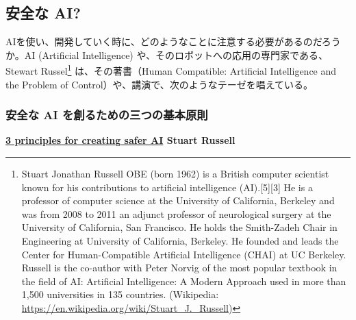 \documentclass[
]{bxjsbook}
\theoremstyle{definition}
\theoremstyle{definition}
\theoremstyle{definition}
\theoremstyle{definition}
\theoremstyle{remark}
\begin{document}
\hypertarget{ux5b89ux5168ux306a-ai}{%
\subsection{安全な AI?}\label{ux5b89ux5168ux306a-ai}}

AIを使い、開発していく時に、どのようなことに注意する必要があるのだろうか。AI (Artificial Intelligence) や、そのロボットへの応用の専門家である、Stewart Russel\footnote{Stuart Jonathan Russell OBE (born 1962) is a British computer scientist known for his contributions to artificial intelligence (AI).{[}5{]}{[}3{]} He is a professor of computer science at the University of California, Berkeley and was from 2008 to 2011 an adjunct professor of neurological surgery at the University of California, San Francisco. He holds the Smith-Zadeh Chair in Engineering at University of California, Berkeley. He founded and leads the Center for Human-Compatible Artificial Intelligence (CHAI) at UC Berkeley. Russell is the co-author with Peter Norvig of the most popular textbook in the field of AI: Artificial Intelligence: A Modern Approach used in more than 1,500 universities in 135 countries. (Wikipedia: \url{https://en.wikipedia.org/wiki/Stuart_J._Russell})} は、その著書（Human Compatible: Artificial Intelligence and the Problem of Control）や、講演で、次のようなテーゼを唱えている。

\hypertarget{ux5b89ux5168ux306a-ai-ux3092ux5275ux308bux305fux3081ux306eux4e09ux3064ux306eux57faux672cux539fux5247}{%
\subsubsection{安全な AI を創るための三つの基本原則}\label{ux5b89ux5168ux306a-ai-ux3092ux5275ux308bux305fux3081ux306eux4e09ux3064ux306eux57faux672cux539fux5247}}

\textbf{\href{https://www.newworldai.com/three-principles-for-creating-safer-artificial-intelligence-stuart-russell/}{3 principles for creating safer AI} \textbar{} Stuart Russell}
\end{document}
